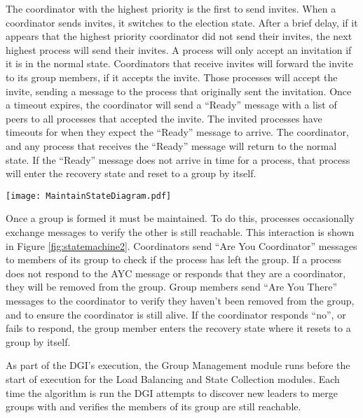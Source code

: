The coordinator with the highest priority is the first to send invites.
When a coordinator sends invites, it switches to the election state.
After a brief delay, if it appears that the highest priority coordinator did not send their invites, the next highest process will send their invites.
A process will only accept an invitation if it is in the normal state.
Coordinators that receive invites will forward the invite to its group members, if it accepts the invite.
Those processes will accept the invite, sending a message to the process that originally sent the invitation.
Once a timeout expires, the coordinator will send a ``Ready'' message with a list of peers to all processes that accepted the invite.
The invited processes have timeouts for when they expect the ``Ready'' message to arrive.
The coordinator, and any process that receives the ``Ready'' message will return to the normal state.
If the ``Ready'' message does not arrive in time for a process, that process will enter the recovery state and reset to a group by itself.

\begin{figure*}[!t]
\texttt{[image: MaintainStateDiagram.pdf]}
\caption{State machine of maintaining a group. The ``Are You Coordinator'' (AYC) messages are the same as those in Figure \ref{fig:statemachine}. AYC and ``Are You There'' (AYT) are periodically sent by processes, and responses to those messages are immediately sent by the receiving process.}
\label{fig:statemachine2}
\end{figure*}


Once a group is formed it must be maintained.
To do this, processes occasionally exchange messages to verify the other is still reachable.
This interaction is shown in Figure \ref{fig:statemachine2}.
Coordinators send ``Are You Coordinator'' messages to members of its group to check if the process has left the group.
If a process does not respond to the AYC message or responds that they are a coordinator, they will be removed from the group. 
Group members send ``Are You There'' messages to the coordinator to verify they haven't been removed from the group, and to ensure the coordinator is still alive.
If the coordinator responds ``no'', or fails to respond, the group member enters the recovery state where it resets to a group by itself.

As part of the DGI's execution, the Group Management module runs before the start of execution for the Load Balancing and State Collection modules.
Each time the algorithm is run the DGI attempts to discover new leaders to merge groups with and verifies the members of its group are still reachable.

